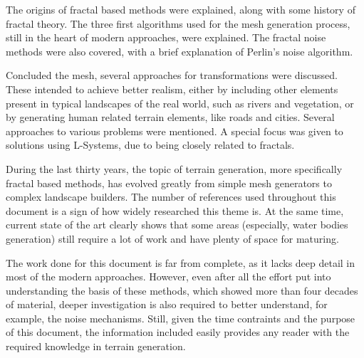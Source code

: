 \documentclass{acmtog}
\begin{document}
The origins of fractal based methods were explained, along with some history of fractal theory. The three first algorithms used for the mesh generation process, still in the heart of modern approaches, were explained. The fractal noise methods were also covered, with a brief explanation of Perlin's noise algorithm.

Concluded the mesh, several approaches for transformations were discussed. These intended to achieve better realism, either by including other elements present in typical landscapes of the real world, such as rivers and vegetation, or by generating human related terrain elements, like roads and cities. Several approaches to various problems were mentioned. A special focus was given to solutions using L-Systems, due to being closely related to fractals.

During the last thirty years, the topic of terrain generation, more specifically fractal based methods, has evolved greatly from simple mesh generators to complex landscape builders. The number of references used throughout this document is a sign of how widely researched this theme is. At the same time, current state of the art clearly shows that some areas (especially, water bodies generation) still require a lot of work and have plenty of space for maturing.

The work done for this document is far from complete, as it lacks deep detail in most of the modern approaches. However, even after all the effort put into understanding the basis of these methods, which showed more than four decades of material, deeper investigation is also required to better understand, for example, the noise mechanisms. Still, given the time contraints and the purpose of this document, the information included easily provides any reader with the required knowledge in terrain generation.



\end{document}
